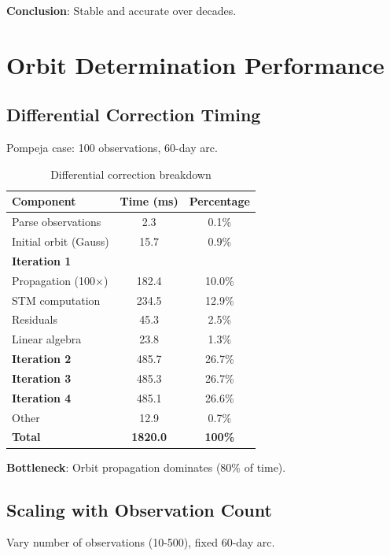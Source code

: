 \textbf{Conclusion}: Stable and accurate over decades.

\section{Orbit Determination Performance}

\subsection{Differential Correction Timing}

Pompeja case: 100 observations, 60-day arc.

\begin{table}[h]
\centering
\caption{Differential correction breakdown}
\begin{tabular}{lcc}
\hline
\textbf{Component} & \textbf{Time (ms)} & \textbf{Percentage} \\
\hline
Parse observations & 2.3 & 0.1\% \\
Initial orbit (Gauss) & 15.7 & 0.9\% \\
\textbf{Iteration 1} & & \\
\quad Propagation (100$\times$) & 182.4 & 10.0\% \\
\quad STM computation & 234.5 & 12.9\% \\
\quad Residuals & 45.3 & 2.5\% \\
\quad Linear algebra & 23.8 & 1.3\% \\
\textbf{Iteration 2} & 485.7 & 26.7\% \\
\textbf{Iteration 3} & 485.3 & 26.7\% \\
\textbf{Iteration 4} & 485.1 & 26.6\% \\
Other & 12.9 & 0.7\% \\
\hline
\textbf{Total} & \textbf{1820.0} & \textbf{100\%} \\
\hline
\end{tabular}
\end{table}

\textbf{Bottleneck}: Orbit propagation dominates (80\% of time).

\subsection{Scaling with Observation Count}

Vary number of observations (10-500), fixed 60-day arc.

